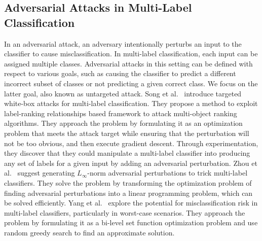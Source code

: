 \subsection{Adversarial Attacks in Multi-Label Classification}
In an adversarial attack, an adversary intentionally perturbs an input to the classifier to cause misclassification.
In multi-label classification, each input can be assigned multiple classes.
Adversarial attacks in this setting can be defined with respect to various goals, such as causing the classifier to predict a different incorrect subset of classes or not predicting a given correct class.
We focus on the latter goal, also known as untargeted attack.
    Song et al.~\cite{MULTIlABEL1} introduce targeted white-box attacks for multi-label classification.
    They propose a method to exploit label-ranking relationships based framework to attack multi-object ranking algorithms.
    They approach the problem by formulating it as an optimization problem that meets the attack target while ensuring that the perturbation will not be too obvious, and then execute gradient descent.
    Through experimentation, they discover that they could manipulate a multi-label classifier into producing any set of labels for a given input by adding an adversarial perturbation.
    Zhou et al.~\cite{MULTIlABEL2} suggest generating $L_{\infty}$-norm adversarial perturbations to trick multi-label classifiers.
    They solve the problem by transforming the optimization problem of finding adversarial perturbations into a linear programming problem, which can be solved efficiently.
    Yang et al.~\cite{MULTIlABEL3} explore the potential for misclassification risk in multi-label classifiers, particularly in worst-case scenarios.
    They approach the problem by formulating it as a bi-level set function optimization problem and use random greedy search to find an approximate solution.
